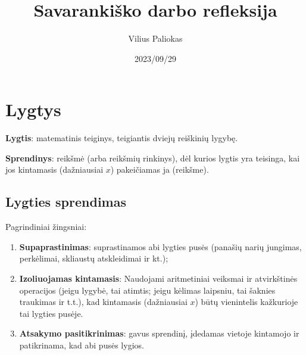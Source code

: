 \documentclass[a4paper]{article}
\title{Savarankiško darbo refleksija}
\author{Vilius Paliokas}
\date{2023/09/29}
\begin{document}
\maketitle

\section{Lygtys}

\textbf{Lygtis}: matematinis teiginys, teigiantis dviejų reiškinių lygybę.

\textbf{Sprendinys}: reikšmė (arba reikšmių rinkinys), dėl kurios lygtis yra
teisinga, kai jos kintamasis (dažniausiai $x$) pakeičiamas ja (reikšme).

\subsection{Lygties sprendimas}

Pagrindiniai žingsniai:

\begin{enumerate}
      \item \textbf{Supaprastinimas}: suprastinamos abi lygties pusės (panašių
            narių jungimas, perkėlimai, skliaustų atskleidimai ir kt.);
      \item \textbf{Izoliuojamas kintamasis}: Naudojami aritmetiniai veiksmai
            ir atvirkštinės operacijos (jeigu lygybė, tai atimtis; jeigu
            kėlimas laipsniu, tai šaknies traukimas ir t.t.), kad kintamasis
            (dažniausiai
            $x$) būtų vienintelis
            kažkurioje tai lygties pusėje.
      \item \textbf{Atsakymo pasitikrinimas}: gavus sprendinį, įdedamas vietoje
            kintamojo ir patikrinama, kad abi pusės lygios.

\end{enumerate}
\end{document}

